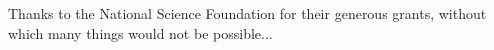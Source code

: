 \begin{frontmatter}
\begin{acknowledgment}
Thanks to the National Science Foundation for their generous 
grants, without which many things would not be possible...

\end{acknowledgment}



\tableofcontents

\listoftables

\listoffigures

\end{frontmatter}
